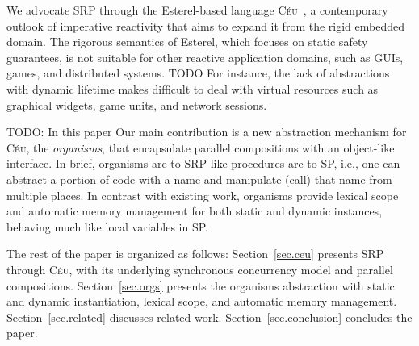 \documentclass{acm_proc_article-sp}
\newcommand{\CEU}{\textsc{C\'{e}u}\xspace}
\newcommand{\1}{\;}
\newcommand{\2}{\;\;}
\newcommand{\3}{\;\;\;}
\newcommand{\5}{\;\;\;\;\;}
\begin{document}
We advocate SRP through the Esterel-based language \CEU~\cite{ceu.sensys13}, a 
contemporary outlook of imperative reactivity that aims to expand it from the 
rigid embedded domain.
%
%
The rigorous semantics of Esterel, which focuses on static safety guarantees, 
is not suitable for other reactive application domains, such as GUIs, games, 
and distributed systems.
%
TODO
For instance, the lack of abstractions with dynamic lifetime makes difficult to 
deal with virtual resources such as graphical widgets, game units, and network 
sessions.

TODO: In this paper
Our main contribution is a new abstraction mechanism for \CEU, the 
\emph{organisms}, that encapsulate parallel compositions with an object-like 
interface.
%
In brief, organisms are to SRP like procedures are to SP, i.e., one can 
abstract a portion of code with a name and manipulate (call) that name from 
multiple places.
%
In contrast with existing work, organisms provide lexical scope and automatic 
memory management for both static and dynamic instances, behaving much like 
local variables in SP.

The rest of the paper is organized as follows:
Section~\ref{sec.ceu} presents SRP through \CEU, with its underlying 
synchronous concurrency model and parallel compositions.
Section~\ref{sec.orgs} presents the organisms abstraction with static and 
dynamic instantiation, lexical scope, and automatic memory management.
Section~\ref{sec.related} discusses related work.
Section~\ref{sec.conclusion} concludes the paper.
\end{document}
